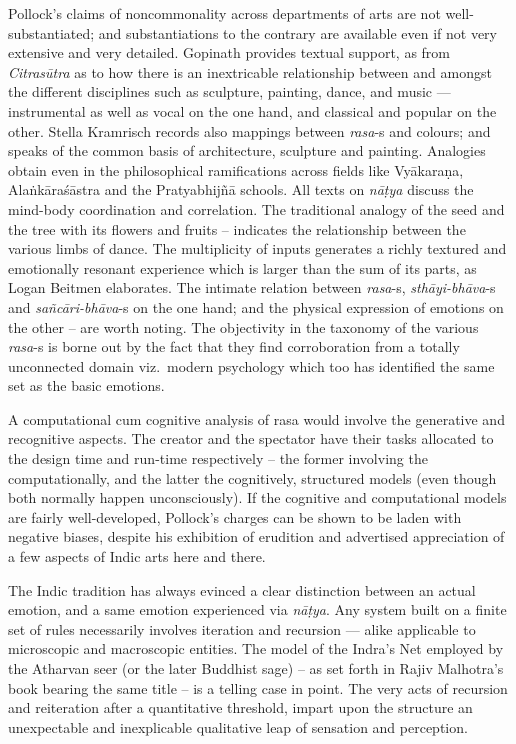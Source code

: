 Pollock’s claims of noncommonality across departments of arts are not well-substantiated; and substantiations to the contrary are available even if not very extensive and very detailed. Gopinath provides textual support, as from \textsl{Citrasūtra} as to how there is an inextricable relationship between and amongst the different disciplines such as sculpture, painting, dance, and music --- instrumental as well as vocal on the one hand, and classical and popular on the other. Stella Kramrisch records also mappings between \textsl{rasa}-s and colours; and speaks of the common basis of architecture, sculpture and painting. Analogies obtain even in the philosophical ramifications across fields like Vyākaraṇa, Alaṅkāraśāstra and the Pratyabhijñā schools. All texts on \textsl{nāṭya} discuss the mind-body coordination and correlation. The traditional analogy of the seed and the tree with its flowers and fruits -- indicates the relationship between the various limbs of dance. The multiplicity of inputs generates a richly textured and emotionally resonant experience which is larger than the sum of its parts, as Logan Beitmen elaborates. The intimate relation between \textsl{rasa}-s, \textsl{sthāyi-bhāva}-s and \textsl{sañcāri-bhāva}-s on the one hand; and the physical expression of emotions on the other -- are worth noting. The objectivity in the taxonomy of the various \textsl{rasa}-s is borne out by the fact that they find corroboration from a totally unconnected domain viz.\ modern psychology which too has identified the same set as the basic emotions.

A computational cum cognitive analysis of rasa would involve the generative and recognitive aspects. The creator and the spectator have their tasks allocated to the design time and run-time respectively -- the former involving the computationally, and the latter the cognitively, structured models (even though both normally happen unconsciously). If the cognitive and computational models are fairly well-developed,  Pollock’s charges can be shown to be laden with negative biases, despite his exhibition of erudition and advertised appreciation of a few aspects of Indic arts here and there.

The Indic tradition has always evinced a clear distinction between an actual emotion, and a same emotion experienced via \textsl{nāṭya}. Any system built on a finite set of rules necessarily involves iteration and recursion --- alike applicable to microscopic and macroscopic entities. The model of the Indra’s Net employed by the Atharvan seer (or the later Buddhist sage) -- as set forth in Rajiv Malhotra’s book bearing the same title -- is a telling case in point. The very acts of recursion and reiteration after a quantitative threshold, impart upon the structure an unexpectable and inexplicable qualitative leap of sensation and perception.

